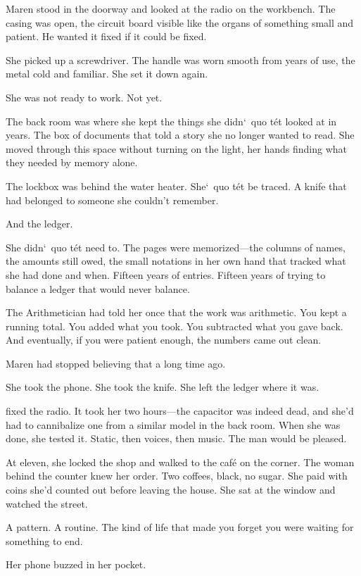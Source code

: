 \documentclass[12pt,letterpaper,openany]{book}
\begin{document}
Maren stood in the doorway and looked at the radio on the workbench. The casing was open, the circuit board visible like the organs of something small and patient. He wanted it fixed if it could be fixed.
\par
She picked up a screwdriver. The handle was worn smooth from years of use, the metal cold and familiar. She set it down again.
\par
She was not ready to work. Not yet.
\par
The back room was where she kept the things she didn`\ quo t\'e{}t looked at in years. The box of documents that told a story she no longer wanted to read. She moved through this space without turning on the light, her hands finding what they needed by memory alone.
\par
The lockbox was behind the water heater. She`\ quo t\'e{}t be traced. A knife that had belonged to someone she couldn't remember.
\par
And the ledger.
\par
She didn`\ quo t\'e{}t need to. The pages were memorized—the columns of names, the amounts still owed, the small notations in her own hand that tracked what she had done and when. Fifteen years of entries. Fifteen years of trying to balance a ledger that would never balance.
\par
The Arithmetician had told her once that the work was arithmetic. You kept a running total. You added what you took. You subtracted what you gave back. And eventually, if you were patient enough, the numbers came out clean.
\par
Maren had stopped believing that a long time ago.
\par
She took the phone. She took the knife. She left the ledger where it was.
\par
\hrulefillShe fixed the radio. It took her two hours—the capacitor was indeed dead, and she'd had to cannibalize one from a similar model in the back room. When she was done, she tested it. Static, then voices, then music. The man would be pleased.
\par
At eleven, she locked the shop and walked to the café on the corner. The woman behind the counter knew her order. Two coffees, black, no sugar. She paid with coins she'd counted out before leaving the house. She sat at the window and watched the street.
\par
A pattern. A routine. The kind of life that made you forget you were waiting for something to end.
\par
Her phone buzzed in her pocket.
\end{document}
